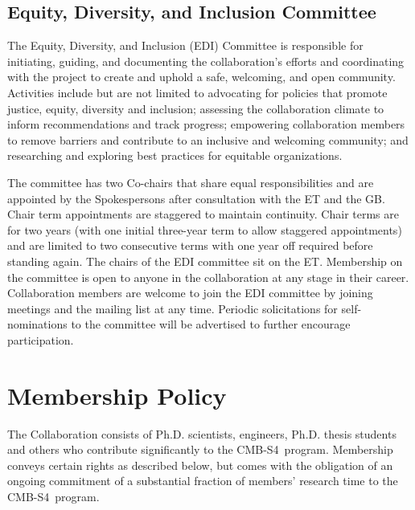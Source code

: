 \documentclass[12pt]{article}
\newcommand\collabname{CMB-S4}
\begin{document}
\subsection{Equity, Diversity, and Inclusion Committee}
The Equity, Diversity, and Inclusion (EDI) Committee is responsible for initiating, guiding, and documenting the collaboration's efforts and coordinating with the project to create and uphold a safe, welcoming, and open community. Activities include but are not limited to advocating for policies that promote justice, equity, diversity and inclusion; assessing the collaboration climate to inform recommendations and track progress; empowering collaboration members to remove barriers and contribute to an inclusive and welcoming community; and researching and exploring best practices for equitable organizations.

The committee has two Co-chairs that share equal responsibilities and are appointed by the Spokespersons after consultation with the ET and the GB. Chair term appointments are staggered to maintain continuity. Chair terms are for two years (with one initial three-year term to allow staggered appointments) and are limited to two consecutive terms with one year off required before standing again. The chairs of the EDI committee sit on the ET. Membership on the committee is open to anyone in the collaboration at any stage in their career. Collaboration members are welcome to join the EDI committee by joining meetings and the mailing list at any time. Periodic solicitations for self-nominations to the committee will be advertised to further encourage participation.

\section{Membership Policy}

The Collaboration consists of Ph.D. scientists, engineers, Ph.D. thesis students and others who contribute significantly to the \collabname\ program. Membership conveys certain rights as described below, but comes with the obligation of an ongoing commitment of a substantial fraction of members' research time to the \collabname\ program. \\
\end{document}
